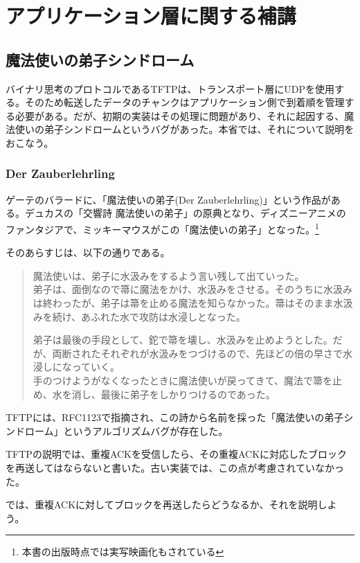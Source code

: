 \chapter{アプリケーション層に関する補講}

\section{魔法使いの弟子シンドローム}

バイナリ思考のプロトコルであるTFTPは、トランスポート層にUDPを使用する。そのため転送したデータのチャンクはアプリケーション側で到着順を管理する必要がある。だが、初期の実装はその処理に問題があり、それに起因する、魔法使いの弟子シンドロームというバグがあった。本省では、それについて説明をおこなう。

\subsection{Der Zauberlehrling}

ゲーテのバラードに、「魔法使いの弟子(Der Zauberlehrling)」という作品がある。デュカスの「交響詩 魔法使いの弟子」の原典となり、ディズニーアニメのファンタジアで、ミッキーマウスがこの「魔法使いの弟子」となった。\footnote{本書の出版時点では実写映画化もされている}

そのあらすじは、以下の通りである。

\begin{quotation}
魔法使いは、弟子に水汲みをするよう言い残して出ていった。
\\
弟子は、面倒なので箒に魔法をかけ、水汲みをさせる。そのうちに水汲みは終わったが、弟子は箒を止める魔法を知らなかった。箒はそのまま水汲みを続け、あふれた水で攻防は水浸しとなった。

弟子は最後の手段として、鉈で箒を壊し、水汲みを止めようとした。だが、両断されたそれぞれが水汲みをつづけるので、先ほどの倍の早さで水浸しになっていく。
\\
手のつけようがなくなったときに魔法使いが戻ってきて、魔法で箒を止め、水を消し、最後に弟子をしかりつけるのであった。
\end{quotation}


TFTPには、RFC1123で指摘され、この詩から名前を採った「魔法使いの弟子シンドローム」というアルゴリズムバグが存在した。

TFTPの説明では、重複ACKを受信したら、その重複ACKに対応したブロックを再送してはならないと書いた。古い実装では、この点が考慮されていなかった。

では、重複ACKに対してブロックを再送したらどうなるか、それを説明しよう。

